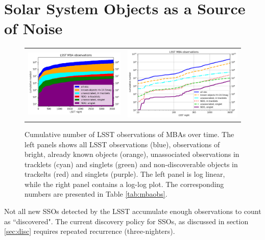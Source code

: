 \section{Solar System Objects as a Source of Noise} \label{sec:noise}
\begin{figure}[tb!]
\begin{center}
\begin{tabular}{cc}
\includegraphics[width=0.5\linewidth]{figs/cum_un_obs_first.png} &
\includegraphics[width=0.5\linewidth]{figs/cum_un_obs_first2.png}\\
\end{tabular}
\end{center}
\caption{Cumulative number of LSST observations of MBAs over time. The left panels shows all LSST observations (blue), observations of bright, already known objects (orange), unassociated observations in tracklets (cyan) and singlets (green) and non-discoverable objects in trackelts (red) and singlets (purple). 
The left panel is log linear, while the right panel contains a log-log plot. The corresponding numbers are presented in Table \ref{tab:mbaobs}.\label{fig:cum_un_obs}}
\end{figure}
%
Not all new SSOs detected by the LSST accumulate enough observations to count as ``discovered". 
The current discovery policy for SSOs, as discussed in section \ref{sec:disc} requires repeated recurrence (three-nighters).  
